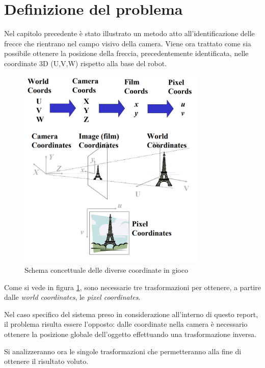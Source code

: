\section{Definizione del problema}
Nel capitolo precedente è stato illustrato un metodo atto all'identificazione delle frecce che rientrano nel campo visivo della camera.
Viene ora trattato come sia possibile ottenere la posizione della freccia, precedentemente identificata, nelle coordinate 3D (U,V,W) rispetto alla base del robot.

\begin{figure}[H]
	\centering
	\includegraphics[width=0.8\textwidth]{Immagini/world_coords.png}
	\caption{Schema concettuale delle diverse coordinate in gioco}
	\label{fig:fromcamtoworld}
\end{figure}

Come si vede in figura \ref{fig:fromcamtoworld}, sono necessarie tre trasformazioni per ottenere, a partire dalle \textit{world coordinates}, le \textit{pixel coordinates}.

Nel caso specifico del sistema preso in considerazione all'interno di questo report, il problema risulta essere l'opposto: dalle coordinate nella camera è necessario ottenere la posizione globale dell'oggetto effettuando una trasformazione inversa.

Si analizzeranno ora le singole trasformazioni che permetteranno alla fine di ottenere il risultato voluto.

